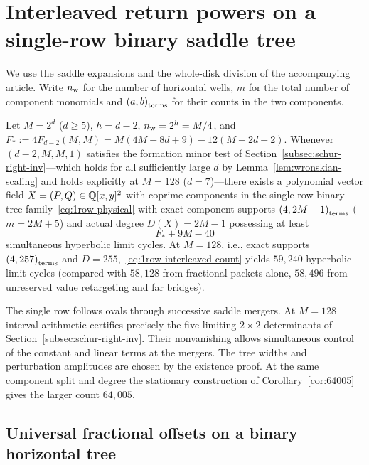 \section{Interleaved return powers on a single-row binary saddle tree}\label{sec:interleaved}
We use the saddle expansions and the whole-disk division of the accompanying article. Write \(n_{\rm w}\) for the number of horizontal wells, \(m\) for the total number of component monomials and \(\left(a,b\right)_{\mathrm{terms}}\) for their counts in the two components.

\begin{theorem}\label{thm:single-row-interleaved}
Let $M=2^d$ ($d\ge 5$), $h=d-2$, $n_{\rm w}=2^h=M/4$, and $F_*:=4F_{d-2}(M,M)=M(4M-8d+9)-12(M-2d+2)$. Whenever $(d-2,M,M,1)$ satisfies the formation minor test of Section~\ref{subsec:schur-right-inv}---which holds for all sufficiently large $d$ by Lemma~\ref{lem:wronskian-scaling} and holds explicitly at $M=128$ ($d=7$)---there exists a polynomial vector field $X=(P,Q)\in\mathbb{Q}[x,y]^2$ with coprime components in the single-row binary-tree family~\eqref{eq:1row-physical} with exact component supports $\left(4,2M+1\right)_{\mathrm{terms}}$ ($m=2M+5$) and actual degree $D(X)=2M-1$ possessing at least
\begin{equation}\label{eq:1row-interleaved-count}
  F_* + 9M - 40
\end{equation}
simultaneous hyperbolic limit cycles. At $M=128$, i.e., exact supports $\left(4,257\right)_{\mathrm{terms}}$ and $D=255$,~\eqref{eq:1row-interleaved-count} yields $59{,}240$ hyperbolic limit cycles (compared with $58{,}128$ from fractional packets alone, $58{,}496$ from unreserved value retargeting and far bridges).
\end{theorem}
The single row follows ovals through successive saddle mergers. At \(M=128\) interval arithmetic certifies precisely the five limiting \(2\times2\) determinants of Section~\ref{subsec:schur-right-inv}. Their nonvanishing allows simultaneous control of the constant and linear terms at the mergers. The tree widths and perturbation amplitudes are chosen by the existence proof. At the same component split and degree the stationary construction of Corollary~\ref{cor:64005} gives the larger count \(64{,}005\).

\subsection{Universal fractional offsets on a binary horizontal tree}

